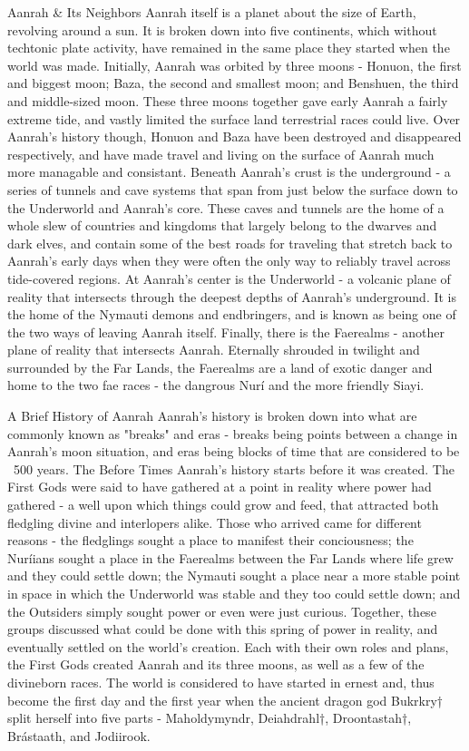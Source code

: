Aanrah \& Its Neighbors
Aanrah itself is a planet about the size of Earth, revolving around a sun. It is broken down into five continents, which without techtonic plate activity, have remained in the same place they started when the world was made. Initially, Aanrah was orbited by three moons - Honuon, the first and biggest moon; Baza, the second and smallest moon; and Benshuen, the third and middle-sized moon. These three moons together gave early Aanrah a fairly extreme tide, and vastly limited the surface land terrestrial races could live. Over Aanrah's history though, Honuon and Baza have been destroyed and disappeared respectively, and have made travel and living on the surface of Aanrah much more managable and consistant.
Beneath Aanrah's crust is the underground - a series of tunnels and cave systems that span from just below the surface down to the Underworld and Aanrah's core. These caves and tunnels are the home of a whole slew of countries and kingdoms that largely belong to the dwarves and dark elves, and contain some of the best roads for traveling that stretch back to Aanrah's early days when they were often the only way to reliably travel across tide-covered regions.
At Aanrah's center is the Underworld - a volcanic plane of reality that intersects through the deepest depths of Aanrah's underground. It is the home of the Nymauti demons and endbringers, and is known as being one of the two ways of leaving Aanrah itself.
Finally, there is the Faerealms - another plane of reality that intersects Aanrah. Eternally shrouded in twilight and surrounded by the Far Lands, the Faerealms are a land of exotic danger and home to the two fae races - the dangrous Nurí and the more friendly Siayi.

A Brief History of Aanrah
Aanrah's history is broken down into what are commonly known as "breaks" and eras - breaks being points between a change in Aanrah's moon situation, and eras being blocks of time that are considered to be ~500 years.
The Before Times
Aanrah's history starts before it was created. The First Gods were said to have gathered at a point in reality where power had gathered - a well upon which things could grow and feed, that attracted both fledgling divine and interlopers alike. Those who arrived came for different reasons - the fledglings sought a place to manifest their conciousness; the Nuríians sought a place in the Faerealms between the Far Lands where life grew and they could settle down; the Nymauti sought a place near a more stable point in space in which the Underworld was stable and they too could settle down; and the Outsiders simply sought power or even were just curious. Together, these groups discussed what could be done with this spring of power in reality, and eventually settled on the world's creation. Each with their own roles and plans, the First Gods created Aanrah and its three moons, as well as a few of the divineborn races.
The world is considered to have started in ernest and, thus become the first day and the first year when the ancient dragon god Bukrkry† split herself into five parts - Maholdymyndr, Deiahdrahl†, Droontastah†, Brástaath, and Jodiirook.

